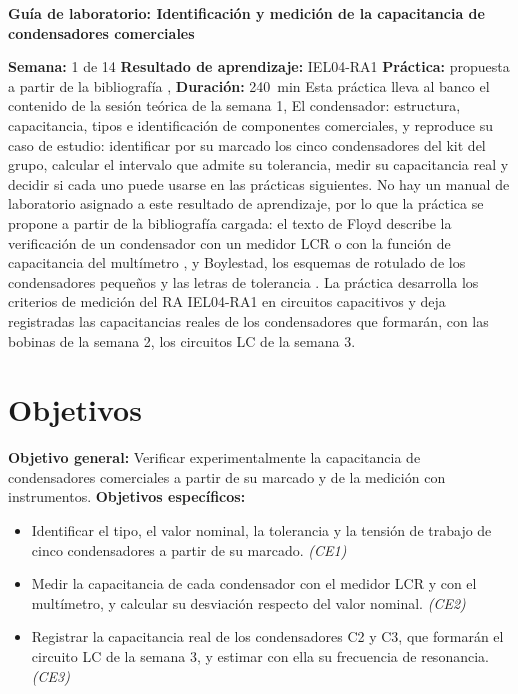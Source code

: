 \documentclass[12pt]{article}
\begin{document}
\nocite{ref1,ref2}

\datosguia
\lineablanco

{\centering\bfseries Guía de laboratorio: Identificación y medición de la capacitancia de condensadores comerciales\par}
\lineablanco
\textbf{Semana:} 1 de 14 \quad \textbf{Resultado de aprendizaje:} IEL04-RA1 \quad \textbf{Práctica:} propuesta a partir de la bibliografía \cite{ref1}, \cite{ref2} \quad \textbf{Duración:} \SI{240}{\minute}
\lineablanco
Esta práctica lleva al banco el contenido de la sesión teórica de la semana 1, \guillemotleft{}El condensador: estructura, capacitancia, tipos e identificación de componentes comerciales\guillemotright{}, y reproduce su caso de estudio: identificar por su marcado los cinco condensadores del kit del grupo, calcular el intervalo que admite su tolerancia, medir su capacitancia real y decidir si cada uno puede usarse en las prácticas siguientes. No hay un manual de laboratorio asignado a este resultado de aprendizaje, por lo que la práctica se propone a partir de la bibliografía cargada: el texto de Floyd describe la verificación de un condensador con un medidor LCR o con la función de capacitancia del multímetro \cite{ref1}, y Boylestad, los esquemas de rotulado de los condensadores pequeños y las letras de tolerancia \cite{ref2}. La práctica desarrolla los criterios de medición del RA IEL04-RA1 en circuitos capacitivos y deja registradas las capacitancias reales de los condensadores que formarán, con las bobinas de la semana 2, los circuitos LC de la semana 3.

\section{Objetivos}\label{sec:objetivos}
\textbf{Objetivo general:} Verificar experimentalmente la capacitancia de condensadores comerciales a partir de su marcado y de la medición con instrumentos.
\lineablanco
\textbf{Objetivos específicos:}
\begin{itemize}
  \item Identificar el tipo, el valor nominal, la tolerancia y la tensión de trabajo de cinco condensadores a partir de su marcado. \emph{(CE1)}
  \item Medir la capacitancia de cada condensador con el medidor LCR y con el multímetro, y calcular su desviación respecto del valor nominal. \emph{(CE2)}
  \item Registrar la capacitancia real de los condensadores C2 y C3, que formarán el circuito LC de la semana 3, y estimar con ella su frecuencia de resonancia. \emph{(CE3)}
\end{itemize}
\end{document}
